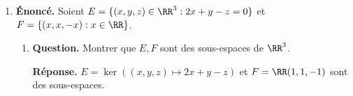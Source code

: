 \documentclass[12pt, a4paper]{article}
\begin{document}
\begin{enumerate}[label=6.\arabic*., start=105]
\begin{minipage}[t]{\linewidth}
\begin{enumerate}[\arabic*.]
  \item \textbf{Question.} $G=\{(x,xy,x+y+z):(x,y,z)\in\RR^3\}$.
\par\smallskip
\textbf{Réponse.} Non : $(1,1,3),(1,2,3)\in G$, mais $(0,1,0)\notin G$.

  \item \textbf{Question.} $H=\{f:\RR\to\RR:f\text{ est monotone}\}$.
\par\smallskip
\textbf{Réponse.} Non : $x\mapsto x^3$ et $x\mapsto-x$ sont monotones, leur somme ne l'est pas.

  \item \textbf{Question.} $I=\{(u_n)\in\RR^{\NN}:(u_n)\text{ est bornée}\}$.
\par\smallskip
\textbf{Réponse.} Oui : si $|u_n|\leq M$ et $|v_n|\leq N$, alors $|\lambda u_n+v_n|\leq|\lambda|M+N$.

  \item \textbf{Question.} $J=\{(u_n)\in\RR^{\NN}:u_{n+2}=3u_{n+1}+2\text{ pour tout }n\}$.
\par\smallskip
\textbf{Réponse.} Non : la suite nulle ne vérifie pas $u_{n+2}=3u_{n+1}+2$.

  \item \textbf{Question.} $K=\{(u_n)\in\RR^{\NN}:u_{n+2}=3u_{n+1}+2u_n\text{ pour tout }n\}$.
\par\smallskip
\textbf{Réponse.} Oui : la récurrence est linéaire et homogène, donc stable par combinaison linéaire.

  \item \textbf{Question.} $L=\{\begin{pmatrix}a&b\\c&d\end{pmatrix}\in\RR^{2\times2}:a+d=0\}$.
\par\smallskip
\textbf{Réponse.} Oui : noyau de la trace.

\end{enumerate}
\end{minipage}

  \item \begin{minipage}[t]{\linewidth}\raggedright
\textbf{Énoncé.} Soient $E=\{(x,y,z)\in\RR^3:2x+y-z=0\}$ et $F=\{(x,x,-x):x\in\RR\}$.

\begin{enumerate}[\arabic*.]
        \item \textbf{Question.} Montrer que $E,F$ sont des sous-espaces de $\RR^3$.
\par\smallskip
\textbf{Réponse.} $E=\ker((x,y,z)\mapsto2x+y-z)$ et $F=\RR(1,1,-1)$ sont des sous-espaces.


\end{enumerate}
\end{minipage}
\end{enumerate}
\end{document}
